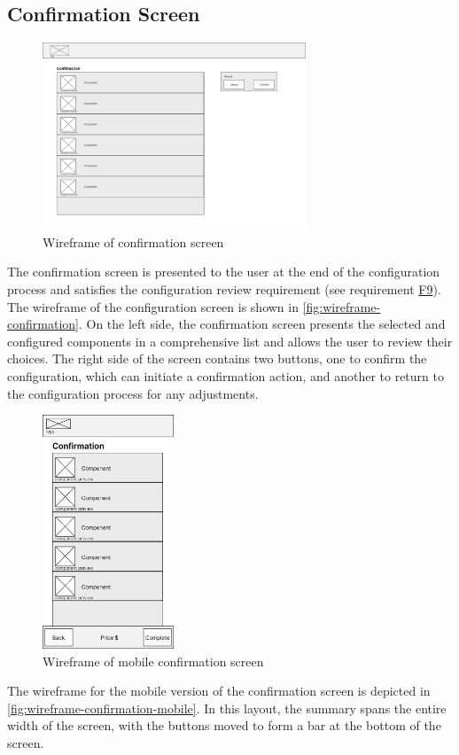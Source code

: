 \subsection{Confirmation Screen}

\begin{figure}[hb]
\centering
\includegraphics[width=0.7\textwidth]{images/wireframe_confirmation_default.png}
\caption{Wireframe of confirmation screen}
\label{fig:wireframe-confirmation}
\end{figure}

The confirmation screen is presented to the user at the end of the configuration process and satisfies the configuration review requirement (see requirement \hyperref[itm:F9]{F9}). The wireframe of the configuration screen is shown in \autoref{fig:wireframe-confirmation}. On the left side, the confirmation screen presents the selected and configured components in a comprehensive list and allows the user to review their choices. The right side of the screen contains two buttons, one to confirm the configuration, which can initiate a confirmation action, and another to return to the configuration process for any adjustments. 

\begin{figure}[htb]
\centering
\includegraphics[width=0.35\textwidth]{images/wireframe_confirmation_mobile_default.png}
\caption{Wireframe of mobile confirmation screen}
\label{fig:wireframe-confirmation-mobile}
\end{figure}

The wireframe for the mobile version of the confirmation screen is depicted in  \autoref{fig:wireframe-confirmation-mobile}. In this layout, the summary spans the entire width of the screen, with the buttons moved to form a bar at the bottom of the screen.